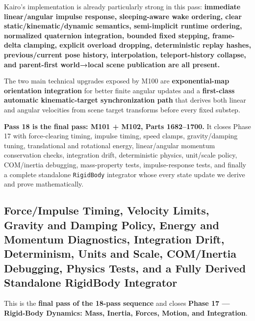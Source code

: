 Kairo's implementation is already particularly strong in this pass: \textbf{immediate linear/angular impulse response, sleeping-aware wake ordering, clear static/kinematic/dynamic semantics, semi-implicit runtime ordering, normalized quaternion integration, bounded fixed stepping, frame-delta clamping, explicit overload dropping, deterministic replay hashes, previous/current pose history, interpolation, teleport-history collapse, and parent-first world→local scene publication are all present.}

The two main technical upgrades exposed by M100 are \textbf{exponential-map orientation integration} for better finite angular updates and a \textbf{first-class automatic kinematic-target synchronization path} that derives both linear and angular velocities from scene target transforms before every fixed substep.

\textbf{Pass 18 is the final pass: M101 + M102, Parts 1682--1700.} It closes Phase 17 with force-clearing timing, impulse timing, speed clamps, gravity/damping tuning, translational and rotational energy, linear/angular momentum conservation checks, integration drift, deterministic physics, unit/scale policy, COM/inertia debugging, mass-property tests, impulse-response tests, and finally a complete standalone \texttt{RigidBody} integrator whose every state update we derive and prove mathematically.

\subsection{Force/Impulse Timing, Velocity Limits, Gravity and Damping Policy, Energy and Momentum Diagnostics, Integration Drift, Determinism, Units and Scale, COM/Inertia Debugging, Physics Tests, and a Fully Derived Standalone RigidBody Integrator}\label{06-engine-ii-ch038-forceimpulse-timing-velocity-limits-gravity-and-damping-policy-energy-and-momentum-diagnostics-integration-drift-determinism-units-and-scale-cominertia-debugging-physics-tests-and-a-fully-derived-standalone-rigidbody-integrator}

\hypertarget{06-engine-ii-ch038-forceimpulse-timing-velocity-limits-gravity-and-damping-policy-energy-and-momentum-diagnostics-integration-drift-determinism-units-and-scale-cominertia-debugging-physics-tests-and-a-fully-derived-standalone-rigidbody-integrator}{}

This is the \textbf{final pass of the 18-pass sequence} and closes \textbf{Phase 17 --- Rigid-Body Dynamics: Mass, Inertia, Forces, Motion, and Integration}.

